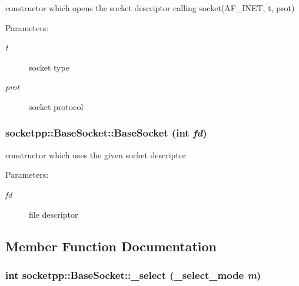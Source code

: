 \begin{CompactItemize}
constructor which opens the socket descriptor calling socket(AF\_\-INET, t, prot) 

\begin{Desc}
\item[Parameters:]
\begin{description}
\item[{\em t}]socket type \item[{\em prot}]socket protocol \end{description}
\end{Desc}
\hypertarget{classsocketpp_1_1BaseSocket_f7e18d6700868abb2b476e797506eafb}{
\subsubsection[{BaseSocket}]{\setlength{\rightskip}{0pt plus 5cm}socketpp::BaseSocket::BaseSocket (int {\em fd})}}
\label{classsocketpp_1_1BaseSocket_f7e18d6700868abb2b476e797506eafb}


constructor which uses the given socket descriptor 

\begin{Desc}
\item[Parameters:]
\begin{description}
\item[{\em fd}]file descriptor \end{description}
\end{Desc}


\subsection{Member Function Documentation}
\hypertarget{classsocketpp_1_1BaseSocket_c4063c52772810a38922b56c81e4b4d2}{
\subsubsection[{\_\-select}]{\setlength{\rightskip}{0pt plus 5cm}int socketpp::BaseSocket::\_\-select ({\bf \_\-select\_\-mode} {\em m})}}
\label{classsocketpp_1_1BaseSocket_c4063c52772810a38922b56c81e4b4d2}



\end{CompactItemize}
